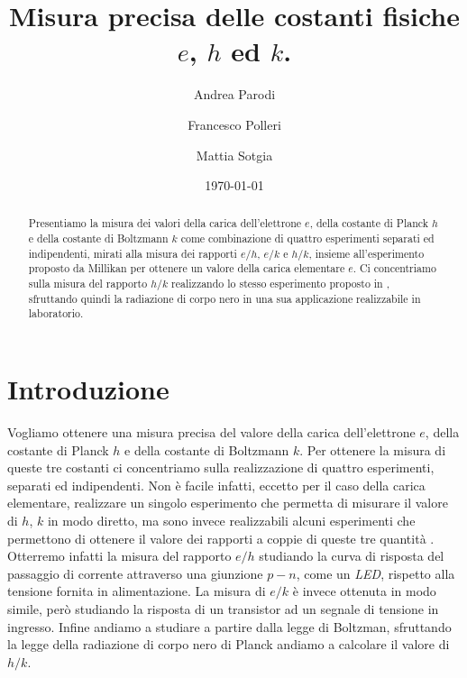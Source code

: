\documentclass[a4paper, nofootinbib]{revtex4-2}
\begin{document}
\title{Misura precisa delle costanti fisiche $e$, $h$ ed $k$.}
\author{Andrea Parodi}
\author{Francesco Polleri}
\author{Mattia Sotgia}
\date{\today}

\begin{abstract}
Presentiamo la misura dei valori della carica dell'elettrone $e$, della costante di Planck $h$ e della costante di Boltzmann $k$ come combinazione di quattro esperimenti separati ed indipendenti, mirati alla misura dei rapporti $e/h$, $e/k$ \cite{inmanMeasurementIntroductoryPhysics1973} e $h/k$, insieme all'esperimento proposto da Millikan \cite{millikanIsolationIonPrecision1911} per ottenere un valore della carica elementare $e$. Ci concentriamo sulla misura del rapporto $h/k$ realizzando lo stesso esperimento proposto in \cite{crandallMinimalApparatusDetermination1983}, sfruttando quindi la radiazione di corpo nero in una sua applicazione realizzabile in laboratorio.
\end{abstract}

\maketitle

\section{Introduzione}

Vogliamo ottenere una misura precisa del valore della carica dell'elettrone $e$, della costante di Planck $h$ e della costante di Boltzmann $k$. Per ottenere la misura di queste tre costanti ci concentriamo sulla realizzazione di quattro esperimenti, separati ed indipendenti. Non è facile infatti, eccetto per il caso della carica elementare, realizzare un singolo esperimento che permetta di misurare il valore di $h$, $k$ in modo diretto, ma sono invece realizzabili alcuni esperimenti che permettono di ottenere il valore dei rapporti a coppie di queste tre quantità \cite{inmanMeasurementIntroductoryPhysics1973, millikanIsolationIonPrecision1911, crandallMinimalApparatusDetermination1983}. Otterremo infatti la misura del rapporto $e/h$ studiando la curva di risposta del passaggio di corrente attraverso una giunzione $p-n$, come un \emph{LED}, rispetto alla tensione fornita in alimentazione. La misura di $e/k$ è invece ottenuta in modo simile, però studiando la risposta di un transistor ad un segnale di tensione in ingresso. Infine andiamo a studiare a partire dalla legge di Boltzman, sfruttando la legge della radiazione di corpo nero di Planck andiamo a calcolare il valore di $h/k$.
\end{document}
